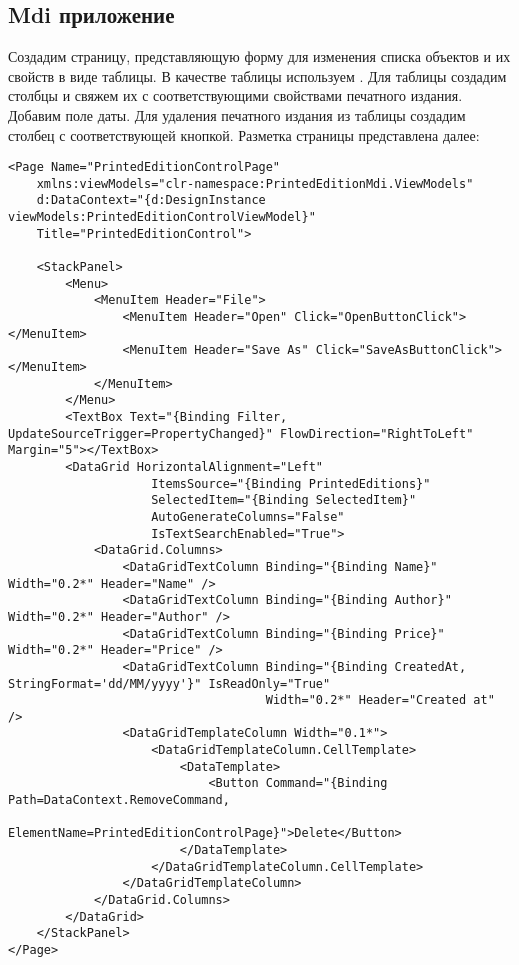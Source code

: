 \documentclass[a4paper,14pt]{extarticle}
\begin{document}
\subsection{Mdi приложение}
Создадим страницу, представляющую форму для изменения списка объектов и их свойств
в виде таблицы. В качестве таблицы используем . Для таблицы создадим
столбцы и свяжем их с соответствующими свойствами печатного издания. Добавим поле даты.
Для удаления печатного издания из таблицы создадим столбец с соответствующей кнопкой.
Разметка страницы представлена далее:

\begin{lstlisting}
<Page Name="PrintedEditionControlPage"
    xmlns:viewModels="clr-namespace:PrintedEditionMdi.ViewModels"
    d:DataContext="{d:DesignInstance viewModels:PrintedEditionControlViewModel}"
    Title="PrintedEditionControl">

    <StackPanel>
        <Menu>
            <MenuItem Header="File">
                <MenuItem Header="Open" Click="OpenButtonClick"></MenuItem>
                <MenuItem Header="Save As" Click="SaveAsButtonClick"></MenuItem>
            </MenuItem>
        </Menu>
        <TextBox Text="{Binding Filter, UpdateSourceTrigger=PropertyChanged}" FlowDirection="RightToLeft" Margin="5"></TextBox>
        <DataGrid HorizontalAlignment="Left"
                    ItemsSource="{Binding PrintedEditions}"
                    SelectedItem="{Binding SelectedItem}"
                    AutoGenerateColumns="False"
                    IsTextSearchEnabled="True">
            <DataGrid.Columns>
                <DataGridTextColumn Binding="{Binding Name}" Width="0.2*" Header="Name" />
                <DataGridTextColumn Binding="{Binding Author}" Width="0.2*" Header="Author" />
                <DataGridTextColumn Binding="{Binding Price}" Width="0.2*" Header="Price" />
                <DataGridTextColumn Binding="{Binding CreatedAt, StringFormat='dd/MM/yyyy'}" IsReadOnly="True"
                                    Width="0.2*" Header="Created at" />
                <DataGridTemplateColumn Width="0.1*">
                    <DataGridTemplateColumn.CellTemplate>
                        <DataTemplate>
                            <Button Command="{Binding Path=DataContext.RemoveCommand,
                                                        ElementName=PrintedEditionControlPage}">Delete</Button>
                        </DataTemplate>
                    </DataGridTemplateColumn.CellTemplate>
                </DataGridTemplateColumn>
            </DataGrid.Columns>
        </DataGrid>
    </StackPanel>
</Page>
\end{lstlisting}
\end{document}
